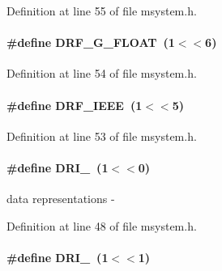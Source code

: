 \begin{DoxyItemize}
\item 
\end{DoxyItemize}

Definition at line 55 of file msystem.h.
\paragraph[{DRF\_\-G\_\-FLOAT}]{\setlength{\rightskip}{0pt plus 5cm}\#define DRF\_\-G\_\-FLOAT~(1$<$$<$6)}\hfill\label{group__msdefineh_ga4ad501f5c59d4db17df10859e7ee97de}

\begin{DoxyItemize}
\item 
\end{DoxyItemize}

Definition at line 54 of file msystem.h.
\paragraph[{DRF\_\-IEEE}]{\setlength{\rightskip}{0pt plus 5cm}\#define DRF\_\-IEEE~(1$<$$<$5)}\hfill\label{group__msdefineh_gacf6c5a8ba75600af57eaab22a9e6f4a5}

\begin{DoxyItemize}
\item 
\end{DoxyItemize}

Definition at line 53 of file msystem.h.
\paragraph[{DRI\_\-16}]{\setlength{\rightskip}{0pt plus 5cm}\#define DRI\_~(1$<$$<$0)}\hfill\label{group__msdefineh_ga6f24d57769829c6f7ba50fb583a6145a}
data representations -\/ 

Definition at line 48 of file msystem.h.
\paragraph[{DRI\_\-32}]{\setlength{\rightskip}{0pt plus 5cm}\#define DRI\_~(1$<$$<$1)}\hfill\label{group__msdefineh_ga23c1be975c22d964171147278528ec8a}

